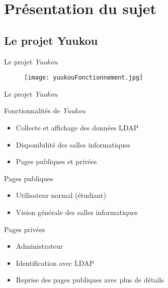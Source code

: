 \section{Pr\'esentation du sujet}

\subsection{Le projet Yuukou}

\begin{frame}{Le projet \textit{Yuukou}}
	\begin{figure}[h]
		\centering
		\texttt{[image: yuukouFonctionnement.jpg]}
	
	\end{figure}
	
\end{frame}


\begin{frame}{Le projet \textit{Yuukou}}
	\begin{block}{Fonctionnalit\'es de \textit{Yuukou}}
		\begin{itemize}
			\item Collecte et affichage des donn\'ees LDAP
			\item Disponibilit\'e des salles informatiques
			\item Pages publiques et priv\'ees
			
		\end{itemize}
		
	\end{block}
	
	\begin{block}{Pages publiques}
		\begin{itemize}
			\item Utilisateur normal (\'etudiant)
			\item Vision g\'en\'erale des salles informatiques
			
		\end{itemize}
		
	\end{block}
	
	\begin{block}{Pages priv\'ees}
		\begin{itemize}
			\item Administrateur
			\item Identification avec LDAP
			\item Reprise des pages publiques avec plus de d\'etails
			
		\end{itemize}
		
	\end{block}
	
\end{frame}

